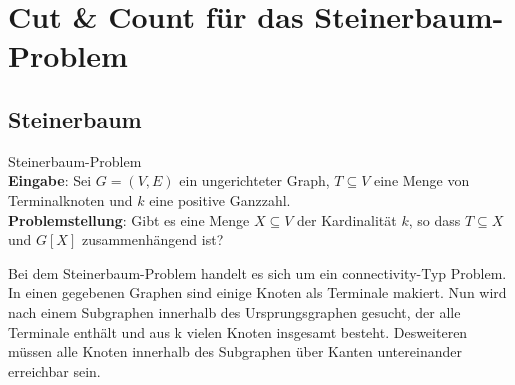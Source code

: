 %
%
%
\chapter{Cut \& Count für das Steinerbaum-Problem}
\label{c:cc_steiner}

\section{Steinerbaum}
\label{sec:steiner}
\begin{definition}
Steinerbaum-Problem\\
\textbf{Eingabe}: Sei $G = (V, E)$ ein ungerichteter Graph, $T \subseteq V$ eine Menge von Terminalknoten und $k$ eine positive Ganzzahl. \\
\textbf{Problemstellung}: Gibt es eine Menge $X \subseteq V$ der Kardinalität $k$, so dass $T \subseteq X$ und $G[X]$ zusammenhängend ist?
\end{definition}

Bei dem Steinerbaum-Problem handelt es sich um ein connectivity-Typ Problem. In einen gegebenen Graphen sind einige Knoten als Terminale makiert. Nun wird nach einem Subgraphen innerhalb des Ursprungsgraphen gesucht, der alle Terminale enthält und aus k vielen Knoten insgesamt besteht. Desweiteren müssen alle Knoten innerhalb des Subgraphen über Kanten untereinander erreichbar sein.

